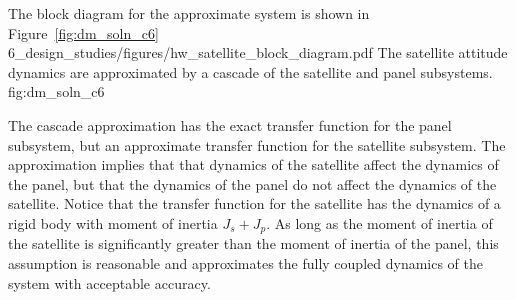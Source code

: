 The block diagram for the approximate system is shown in Figure~\ref{fig:dm_soln_c6}
	{6_design_studies/figures/hw_satellite_block_diagram.pdf}
	{The satellite attitude dynamics are approximated by a cascade of the satellite and panel subsystems.}
	{fig:dm_soln_c6}

The cascade approximation has the exact transfer function for the panel subsystem, but an approximate transfer function for the satellite subsystem. The approximation implies that that dynamics of the satellite affect the dynamics of the panel, but that the dynamics of the panel do not affect the dynamics of the satellite. Notice that the transfer function for the satellite has the dynamics of a rigid body with moment of inertia $J_s+J_p$. As long as the moment of inertia of the satellite is significantly greater than the moment of inertia of the panel, this assumption is reasonable and approximates the fully coupled dynamics of the system  with acceptable accuracy.
